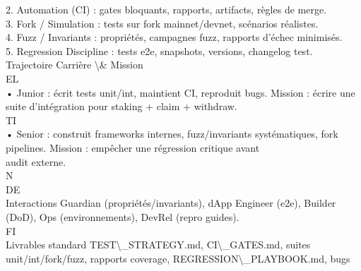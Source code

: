2. Automation (CI) : gates bloquants, rapports, artifacts, règles de merge.\\
\vspace{0.5em}
3. Fork / Simulation : tests sur fork mainnet/devnet, scénarios réalistes.\\
\vspace{0.5em}
4. Fuzz / Invariants : propriétés, campagnes fuzz, rapports d’échec minimisés.\\
\vspace{0.5em}
5. Regression Discipline : tests e2e, snapshots, versions, changelog test.\\
\vspace{0.5em}
Trajectoire Carrière \textbackslash{}& Mission\\
\vspace{0.5em}
\vspace{0.5em}
\vspace{0.5em}
\vspace{0.5em}
EL\\
• Junior : écrit tests unit/int, maintient CI, reproduit bugs. Mission : écrire une suite d’intégration pour staking + claim + withdraw.\\
\vspace{0.5em}
\vspace{0.5em}
\vspace{0.5em}
\vspace{0.5em}
TI\\
• Senior : construit frameworks internes, fuzz/invariants systématiques, fork pipelines. Mission : empêcher une régression critique avant\\
audit externe.\\
\vspace{0.5em}
\vspace{0.5em}
\vspace{0.5em}
\vspace{0.5em}
N\\
DE\\
Interactions Guardian (propriétés/invariants), dApp Engineer (e2e), Builder (DoD), Ops (environnements), DevRel (repro guides).\\
\vspace{0.5em}
\vspace{0.5em}
\vspace{0.5em}
\vspace{0.5em}
FI\\
Livrables standard     TEST\textbackslash{}_STRATEGY.md, CI\textbackslash{}_GATES.md, suites unit/int/fork/fuzz, rapports coverage, REGRESSION\textbackslash{}_PLAYBOOK.md, bugs\\
